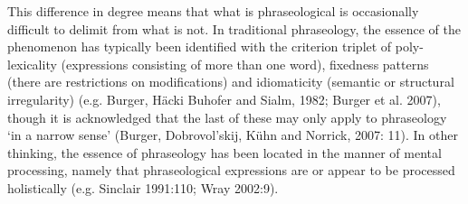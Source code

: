 \documentclass[12pt]{article}
\newenvironment{styleStandard}{\setlength\leftskip{0cm}\setlength\rightskip{0cm plus 1fil}\setlength\parindent{0cm}\setlength\parfillskip{0pt plus 1fil}\setlength\parskip{0in plus 1pt}\writerlistparindent\writerlistleftskip\leavevmode\normalfont\normalsize\writerlistlabel\ignorespaces}{\unskip\vspace{0.111in plus 0.0111in}\par}
\newcommand\writerlistleftskip{}
\newcommand\writerlistparindent{}
\newcommand\writerlistlabel{}
\begin{document}
\begin{styleStandard}
This difference in degree means that what is phraseological is occasionally difficult to delimit from what is not. In traditional phraseology, the essence of the phenomenon has typically been identified with the criterion triplet of poly-lexicality (expressions consisting of more than one word), fixedness patterns (there are restrictions on modifications) and idiomaticity (semantic or structural irregularity) (e.g. Burger, Häcki Buhofer and Sialm, 1982; Burger et al. 2007), though it is acknowledged that the last of these may only apply to phraseology ‘in a narrow sense’ (Burger, Dobrovol’skij, Kühn and Norrick, 2007: 11). In other thinking, the essence of phraseology has been located in the manner of mental processing, namely that phraseological expressions are or appear to be processed holistically (e.g. Sinclair 1991:110; Wray 2002:9).
\end{styleStandard}
\end{document}
